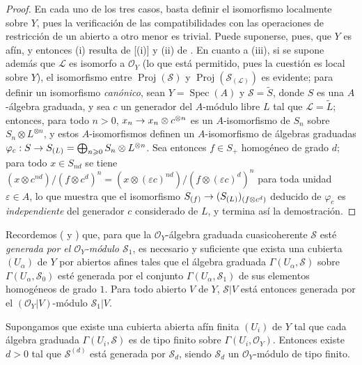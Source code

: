 \documentclass[oneside,10pt]{amsart}
\makeatletter
\renewcommand{\geq}{\geqslant}
\newcommand{\ega@arrow}[2]{\mathchoice{#1}{#2}{#2}{#2}}
\renewcommand{\to}{\ega@arrow{\longrightarrow}{\rightarrow}}
\let\EGAOriginalLabel\label
\renewcommand{\label}[1]{\phantomsection\EGAOriginalLabel{#1}}
\makeatother
\begin{document}
\begin{proof}
En cada uno de los tres casos, basta definir el isomorfismo localmente sobre $Y$, pues la verificación de las compatibilidades con las operaciones de restricción de un abierto a otro menor es trivial.
Puede suponerse, pues, que $Y$ es afín, y entonces (i) resulta de [(i)] y (ii) de .
En cuanto a (iii), si se supone además que $\mathcal{L}$ es isomorfo a $\mathcal{O}_Y$ (lo que está permitido, pues la cuestión es local sobre $Y$), el isomorfismo entre $\operatorname{Proj}(\mathcal{S})$ y $\operatorname{Proj}(\mathcal{S}_{(\mathcal{L})})$ es evidente; para definir un isomorfismo \emph{canónico}, sean $Y=\operatorname{Spec}(A)$ y $\mathcal{S}=\widetilde{S}$, donde $S$ es una $A$-álgebra graduada, y sea $c$ un generador del $A$-módulo libre $L$ tal que $\mathcal{L}=\widetilde{L}$; entonces, para todo $n>0$, $x_n\to x_n\otimes c^{\otimes n}$ es un $A$-isomorfismo de $S_n$ sobre $S_n\otimes L^{\otimes n}$, y estos $A$-isomorfismos definen un $A$-isomorfismo de álgebras graduadas $\varphi_c:S\to S_{(L)}
=\bigoplus_{n\geq0}S_n\otimes L^{\otimes n}$.
Sea entonces $f\in S_+$ homogéneo de grado $d$; para todo $x\in S_{nd}$ se tiene
$(x\otimes c^{nd})/(f\otimes c^d)^n
=(x\otimes(\varepsilon c)^{nd})/(f\otimes(\varepsilon c)^d)^n$
para toda unidad $\varepsilon\in A$, lo que muestra que el isomorfismo $S_{(f)}\to(S_{(L)})_{(f\otimes c^d)}$ deducido de $\varphi_c$ es \emph{independiente} del generador $c$ considerado de $L$, y termina así la demostración.
\end{proof}

\begin{env}[3.1.9]
\label{II.3.1.9-fr}
Recordemos ( y ) que, para que la $\mathcal{O}_Y$-álgebra graduada cuasicoherente $\mathcal{S}$ esté \emph{generada por el $\mathcal{O}_Y$-módulo $\mathcal{S}_1$}, es necesario y suficiente que exista una cubierta $(U_\alpha)$ de $Y$ por abiertos afines tales que el álgebra graduada $\Gamma(U_\alpha,\mathcal{S})$ sobre $\Gamma(U_\alpha,\mathcal{S}_0)$ esté generada por el conjunto $\Gamma(U_\alpha,\mathcal{S}_1)$ de sus elementos homogéneos de grado $1$.
Para todo abierto $V$ de $Y$, $\mathcal{S}|V$ está entonces generada por el $(\mathcal{O}_Y|V)$-módulo $\mathcal{S}_1|V$.
\end{env}

\begin{proposition}[3.1.10]
\label{II.3.1.10-fr}
Supongamos que existe una cubierta abierta afín finita $(U_i)$ de $Y$ tal que cada álgebra graduada $\Gamma(U_i,\mathcal{S})$ es de tipo finito sobre $\Gamma(U_i,\mathcal{O}_Y)$.
Entonces existe $d>0$ tal que $\mathcal{S}^{(d)}$ está generada por $\mathcal{S}_d$, siendo $\mathcal{S}_d$ un $\mathcal{O}_Y$-módulo de tipo finito.
\end{proposition}
\end{document}
